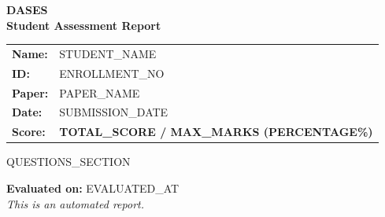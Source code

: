 \documentclass[a4paper,10pt]{article}
\begin{document}
\begin{center}
    {\Huge \textbf{\textcolor{dasesgreen}{DASES}}}\\[0.5cm]
    {\Large \textbf{Student Assessment Report}}\\[0.5cm]
\end{center}

\noindent
\begin{tcolorbox}[colback=white,colframe=navyblue,title=\textbf{STUDENT INFORMATION}]
    \begin{tabular}{ll}
        \textbf{Name:} & {{STUDENT_NAME}} \\
        \textbf{ID:} & {{ENROLLMENT_NO}} \\
        \textbf{Paper:} & {{PAPER_NAME}} \\
        \textbf{Date:} & {{SUBMISSION_DATE}} \\
        \textbf{Score:} & \textcolor{dasesgreen}{\textbf{ {{TOTAL_SCORE}} / {{MAX_MARKS}} ({{PERCENTAGE}}\%)}}
    \end{tabular}
\end{tcolorbox}

\vspace{0.5cm}

{{QUESTIONS_SECTION}}

\vfill
\noindent \textbf{Evaluated on:} {{EVALUATED_AT}} \\
\textit{\small This is an automated report.}
\end{document}

